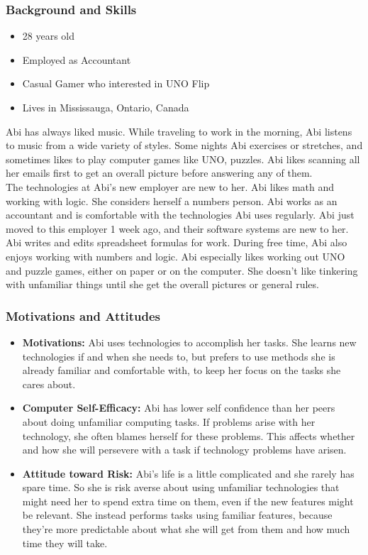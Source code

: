 \documentclass[12pt, titlepage]{article}
\begin{document}
\subsubsection{Background and Skills}
\begin{itemize}
    \item 28 years old
    \item Employed as Accountant
    \item Casual Gamer who interested in UNO Flip
    \item Lives in Mississauga, Ontario, Canada
\end{itemize}
Abi has always liked music. While traveling to work in the morning, Abi listens to music from a wide variety of styles. Some nights Abi exercises or stretches, and sometimes likes to play computer games like UNO, puzzles. Abi likes scanning all her emails first to get an overall picture before answering any of them.\\
The technologies at Abi's new employer are new to her. Abi likes math and working with logic. She considers herself a numbers person. Abi works as an accountant and is comfortable with the technologies Abi uses regularly. Abi just moved to this employer 1 week ago, and their software systems are new to her. Abi writes and edits spreadsheet formulas for work. During free time, Abi also enjoys working with numbers and logic. Abi especially likes working out UNO and puzzle games, either on paper or on the computer. She doesn't like tinkering with unfamiliar things until she get the overall pictures or general rules.
\subsubsection{Motivations and Attitudes}
\begin{itemize}
    \item \textbf{Motivations:} Abi uses technologies to accomplish her tasks. She learns new technologies if and when she needs to, but prefers to use methods she is already familiar and comfortable with, to keep her focus on the tasks she cares about.
    \item \textbf{Computer Self-Efficacy:} Abi has lower self confidence than her peers about doing unfamiliar computing tasks. If problems arise with her technology, she often blames herself for these problems. This affects whether and how she will persevere with a task if technology problems have arisen.
    \item \textbf{Attitude toward Risk:} Abi's life is a little complicated and she rarely has spare time. So she is risk averse about using unfamiliar technologies that might need her to spend extra time on them, even if the new features might be relevant. She instead performs tasks using familiar features, because they're more predictable about what she will get from them and how much time they will take.
\end{itemize}
\end{document}
